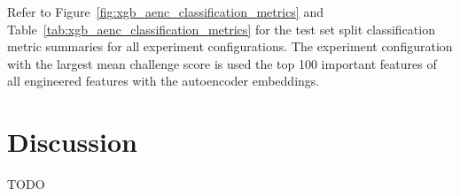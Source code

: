 \documentclass[\main/thesis.tex]{subfiles}
\begin{document}
Refer to Figure~\ref{fig:xgb_aenc_classification_metrics} and Table~\ref{tab:xgb_aenc_classification_metrics} for the test set split classification metric summaries for all experiment configurations.
The experiment configuration with the largest mean challenge score is used the top 100 important features of all engineered features with the autoencoder embeddings.

\section{Discussion}
TODO




\end{document}

